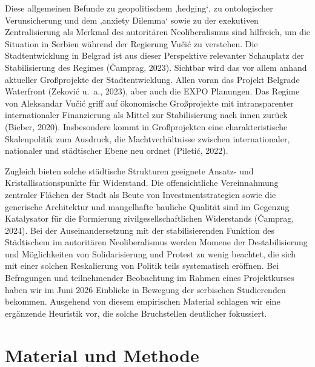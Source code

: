 \documentclass[
  ngerman,
]{agujournal2019}
\begin{document}
Diese allgemeinen Befunde zu geopolitischem ‚hedging`, zu ontologischer
Verunsicherung und dem ‚anxiety Dilemma` sowie zu der exekutiven
Zentralisierung als Merkmal des autoritären Neoliberalismus sind
hilfreich, um die Situation in Serbien während der Regierung Vučić zu
verstehen. Die Stadtentwicklung in Belgrad ist aus dieser Perspektive
relevanter Schauplatz der Stabilisierung des Regimes (Čamprag, 2023).
Sichtbar wird das vor allem anhand aktueller Großprojekte der
Stadtentwicklung. Allen voran das Projekt Belgrade Waterfront (Zeković
u.~a., 2023), aber auch die EXPO Planungen. Das Regime von Aleksandar
Vučić griff auf ökonomische Großprojekte mit intransparenter
internationaler Finanzierung als Mittel zur Stabilisierung nach innen
zurück (Bieber, 2020). Insbesondere kommt in Großprojekten eine
charakteristische Skalenpolitik zum Ausdruck, die Machtverhältnisse
zwischen internationaler, nationaler und städtischer Ebene neu ordnet
(Piletić, 2022).

Zugleich bieten solche städtische Strukturen geeignete Ansatz- und
Kristallisationspunkte für Widerstand. Die offensichtliche Vereinnahmung
zentraler Flächen der Stadt als Beute von Investmentstrategien sowie die
generische Architektur und mangelhafte bauliche Qualität sind im
Gegenzug Katalysator für die Formierung zivilgesellschaftlichen
Widerstands (Čamprag, 2024). Bei der Auseinandersetzung mit der
stabilisierenden Funktion des Städtischem im autoritären Neoliberalismus
werden Momene der Destabilisierung und Möglichkeiten von Solidarisierung
und Protest zu wenig beachtet, die sich mit einer solchen Reskalierung
von Politik teils systematisch eröffnen. Bei Befragungen und
teilnehmender Beobachtung im Rahmen eines Projektkurses haben wir im
Juni 2026 Einblicke in Bewegung der serbischen Studierenden bekommen.
Ausgehend von diesem empirischen Material schlagen wir eine ergänzende
Heuristik vor, die solche Bruchstellen deutlicher fokussiert.

\section{Material und Methode}\label{material-und-methode}
\end{document}
